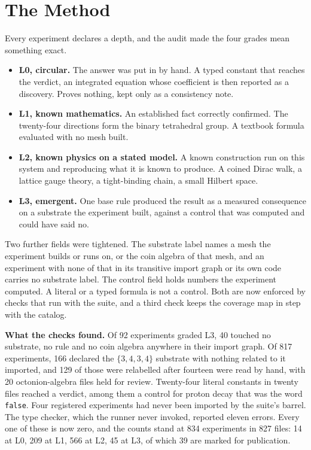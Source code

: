 \section{The Method}

Every experiment declares a depth, and the audit made the four grades mean something exact.

\begin{itemize}
\item \textbf{L0, circular.} The answer was put in by hand. A typed constant that reaches the verdict, an integrated
equation whose coefficient is then reported as a discovery. Proves nothing, kept only as a consistency note.
\item \textbf{L1, known mathematics.} An established fact correctly confirmed. The twenty-four directions form the
binary tetrahedral group. A textbook formula evaluated with no mesh built.
\item \textbf{L2, known physics on a stated model.} A known construction run on this system and reproducing what it
is known to produce. A coined Dirac walk, a lattice gauge theory, a tight-binding chain, a small Hilbert space.
\item \textbf{L3, emergent.} One base rule produced the result as a measured consequence on a substrate the
experiment built, against a control that was computed and could have said no.
\end{itemize}

Two further fields were tightened. The substrate label names a mesh the experiment builds or runs on, or the coin
algebra of that mesh, and an experiment with none of that in its transitive import graph or its own code carries no
substrate label. The control field holds numbers the experiment computed. A literal or a typed formula is not a
control. Both are now enforced by checks that run with the suite, and a third check keeps the coverage map in step
with the catalog.

\textbf{What the checks found.} Of 92 experiments graded L3, 40 touched no substrate, no rule and no coin algebra
anywhere in their import graph. Of 817 experiments, 166 declared the $\{3,4,3,4\}$ substrate with nothing related
to it imported, and 129 of those were relabelled after fourteen were read by hand, with 20 octonion-algebra files
held for review. Twenty-four literal constants in twenty files reached a verdict, among them a control for proton
decay that was the word \texttt{false}. Four registered experiments had never been imported by the suite's barrel.
The type checker, which the runner never invoked, reported eleven errors. Every one of these is now zero, and the
counts stand at 834 experiments in 827 files: 14 at L0, 209 at L1, 566 at L2, 45 at L3, of which 39 are marked for
publication.

